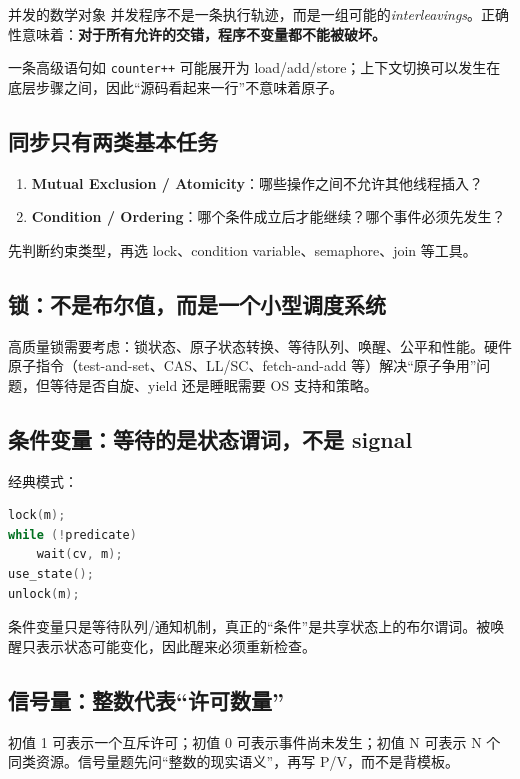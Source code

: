 \documentclass[11pt,a4paper,openany]{ctexbook}
\newcommand{\key}[1]{\textbf{\color{deep}#1}}
\newcommand{\eng}[1]{\textit{#1}}
\begin{document}
\begin{corebox}{并发的数学对象}
并发程序不是一条执行轨迹，而是一组可能的\eng{interleavings}。正确性意味着：\textbf{对于所有允许的交错，程序不变量都不能被破坏。}
\end{corebox}

一条高级语句如 \texttt{counter++} 可能展开为 load/add/store；上下文切换可以发生在底层步骤之间，因此“源码看起来一行”不意味着原子。

\subsection{同步只有两类基本任务}
\begin{enumerate}
  \item \key{Mutual Exclusion / Atomicity}：哪些操作之间不允许其他线程插入？
  \item \key{Condition / Ordering}：哪个条件成立后才能继续？哪个事件必须先发生？
\end{enumerate}
先判断约束类型，再选 lock、condition variable、semaphore、join 等工具。

\subsection{锁：不是布尔值，而是一个小型调度系统}
高质量锁需要考虑：锁状态、原子状态转换、等待队列、唤醒、公平和性能。硬件原子指令（test-and-set、CAS、LL/SC、fetch-and-add 等）解决“原子争用”问题，但等待是否自旋、yield 还是睡眠需要 OS 支持和策略。

\subsection{条件变量：等待的是状态谓词，不是 signal}
经典模式：
\begin{lstlisting}[language=C]
lock(m);
while (!predicate)
    wait(cv, m);
use_state();
unlock(m);
\end{lstlisting}
条件变量只是等待队列/通知机制，真正的“条件”是共享状态上的布尔谓词。被唤醒只表示状态可能变化，因此醒来必须重新检查。

\subsection{信号量：整数代表“许可数量”}
初值 1 可表示一个互斥许可；初值 0 可表示事件尚未发生；初值 N 可表示 N 个同类资源。信号量题先问“整数的现实语义”，再写 P/V，而不是背模板。
\end{document}
